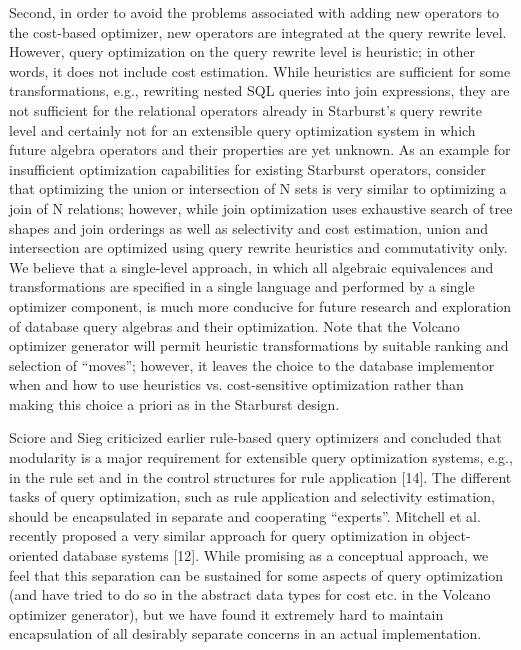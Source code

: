 \documentclass[a4paper,12pt,notitlepage,twoside,openright]{article}
\begin{document}
Second, in order to avoid the problems associated with adding new
operators to the cost-based optimizer, new operators are integrated at
the query rewrite level. However, query optimization on the query
rewrite level is heuristic; in other words, it does not include cost
estimation. While heuristics are sufficient for some transformations,
e.g., rewriting nested SQL queries into join expressions, they are not
sufficient for the relational operators already in Starburst's query
rewrite level and certainly not for an extensible query optimization
system in which future algebra operators and their properties are yet
unknown. As an example for insufficient optimization capabilities for
existing Starburst operators, consider that optimizing the union or
intersection of N sets is very similar to optimizing a join of N
relations; however, while join optimization uses exhaustive search of
tree shapes and join orderings as well as selectivity and cost
estimation, union and intersection are optimized using query rewrite
heuristics and commutativity only. We believe that a single-level
approach, in which all algebraic equivalences and transformations are
specified in a single language and performed by a single optimizer
component, is much more conducive for future research and exploration of
database query algebras and their optimization. Note that the Volcano
optimizer generator will permit heuristic transformations by suitable
ranking and selection of ``moves''; however, it leaves the choice to the
database implementor when and how to use heuristics vs. cost-sensitive
optimization rather than making this choice a priori as in the Starburst
design.

Sciore and Sieg criticized earlier rule-based query optimizers and
concluded that modularity is a major requirement for extensible query
optimization systems, e.g., in the rule set and in the control
structures for rule application {[}14{]}. The different tasks of query
optimization, such as rule application and selectivity estimation,
should be encapsulated in separate and cooperating ``experts''. Mitchell
et al. recently proposed a very similar approach for query optimization
in object-oriented database systems {[}12{]}. While promising as a
conceptual approach, we feel that this separation can be sustained for
some aspects of query optimization (and have tried to do so in the
abstract data types for cost etc. in the Volcano optimizer generator),
but we have found it extremely hard to maintain encapsulation of all
desirably separate concerns in an actual implementation.
\end{document}
